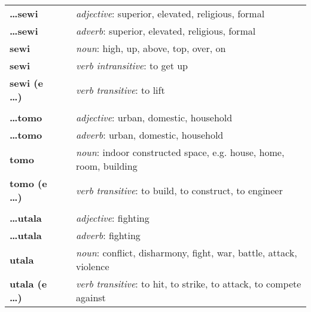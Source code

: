 \begin{supertabular}{p{2,5cm}|ll}
    \textbf{\dots sewi}      &  & \textit{adjective}: superior, elevated, religious, formal                      \\ %
    \textbf{\dots sewi}      &  & \textit{adverb}: superior, elevated, religious, formal                         \\ %
    \textbf{sewi}            &  & \textit{noun}: high, up, above, top, over, on                                  \\ %
    \textbf{sewi}            &  & \textit{verb intransitive}: to get up                                          \\ %
    \textbf{sewi (e \dots)}  &  & \textit{verb transitive}: to lift                                              \\ %
                             &  &                                                                                \\ %
    \textbf{\dots tomo}      &  & \textit{adjective}: urban, domestic, household                                 \\ %
    \textbf{\dots tomo}      &  & \textit{adverb}: urban, domestic, household                                    \\ %
    \textbf{tomo}            &  & \textit{noun}: indoor constructed space, e.g. house, home, room, building      \\ %
    \textbf{tomo (e \dots)}  &  & \textit{verb transitive}: to build, to construct, to engineer                  \\ %
                             &  &                                                                                \\ %
    \textbf{\dots utala}     &  & \textit{adjective}: fighting                                                   \\ %
    \textbf{\dots utala}     &  & \textit{adverb}: fighting                                                      \\ %
    \textbf{utala}           &  & \textit{noun}: conflict, disharmony, fight, war, battle, attack, violence      \\ %
    \textbf{utala (e \dots)} &  & \textit{verb transitive}: to hit, to strike, to attack, to compete against     \\ %
\end{supertabular} \\
%

